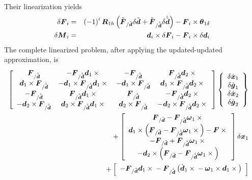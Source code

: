 \documentclass[10pt,dvips,fleqn]{report}
\newcommand{\T}[1]{\boldsymbol{#1}}
\begin{document}
Their linearization yields
\begin{eqnarray*}
	\delta\T{F}_i & = & \plbr{ -1 }^i \T{R}_{1h} \plbr{
		\tilde{\T{F}}_{/\tilde{\T{d}}} \delta{\tilde{\T{d}}}
		+ \tilde{\T{F}}_{/\dot{\tilde{\T{d}}}} \delta\dot{\tilde{\T{d}}}
	} - \T{F}_i \times \T{\theta}_{1\delta} \\
	\delta\T{M}_i & = & \T{d}_i \times \delta\T{F}_i
	- \T{F}_i \times \delta \T{d}_i
\end{eqnarray*}
The complete linearized problem, after applying the updated-updated 
approximation, is
\begin{eqnarray*}
	\sqbr{\matr{cccc}{
		\T{F}_{/\dot{\tilde{\T{d}}}} & -\T{F}_{/\dot{\tilde{\T{d}}}} \T{d}_1\times{} &
			- \T{F}_{/\dot{\tilde{\T{d}}}} & \T{F}_{/\dot{\tilde{\T{d}}}} \T{d}_2\times{} \\
		\T{d}_1 \times \T{F}_{/\dot{\tilde{\T{d}}}} &
			- \T{d}_1 \times \T{F}_{/\dot{\tilde{\T{d}}}} \T{d}_1\times{} &
			- \T{d}_1 \times \T{F}_{/\dot{\tilde{\T{d}}}} &
			\T{d}_1 \times \T{F}_{/\dot{\tilde{\T{d}}}} \T{d}_2\times{} \\
		- \T{F}_{/\dot{\tilde{\T{d}}}} & \T{F}_{/\dot{\tilde{\T{d}}}} \T{d}_1\times{} &
			\T{F}_{/\dot{\tilde{\T{d}}}} & - \T{F}_{/\dot{\tilde{\T{d}}}} \T{d}_2\times{} \\
		- \T{d}_2 \times \T{F}_{/\dot{\tilde{\T{d}}}} &
			\T{d}_2 \times \T{F}_{/\dot{\tilde{\T{d}}}} \T{d}_1\times{} &
			\T{d}_2 \times \T{F}_{/\dot{\tilde{\T{d}}}} &
			- \T{d}_2 \times \T{F}_{/\dot{\tilde{\T{d}}}} \T{d}_2\times{}
	}} \cubr{\cvvect{
		\delta\dot{\T{x}}_1 \\
		\delta\dot{\T{g}}_1 \\
		\delta\dot{\T{x}}_2 \\
		\delta\dot{\T{g}}_2
	}} & & \\
	\mbox{} + \sqbr{\cvvect{
		\T{F}_{/\tilde{\T{d}}} - \T{F}_{/\dot{\tilde{\T{d}}}} \T{\omega}_1 \times{} \\
		\T{d}_1 \times \plbr{\T{F}_{/\tilde{\T{d}}} - \T{F}_{/\dot{\tilde{\T{d}}}} \T{\omega}_1 \times{}}
			- \T{F}\times{} \\
		- \T{F}_{/\tilde{\T{d}}} + \T{F}_{/\dot{\tilde{\T{d}}}} \T{\omega}_1 \times{} \\
		- \T{d}_2 \times \plbr{\T{F}_{/\tilde{\T{d}}} - \T{F}_{/\dot{\tilde{\T{d}}}} \T{\omega}_1 \times{}}
	}} \delta\T{x}_1 & & \\
	\mbox{} + \sqbr{\cvvect{
		- \T{F}_{/\tilde{\T{d}}} \T{d}_1 \times{}
		- \T{F}_{/\dot{\tilde{\T{d}}}} \plbr{
			\dot{\T{d}}_1 \times{} - \T{\omega}_1 \times \T{d}_1\times{}
}}}
\end{eqnarray*}
\end{document}
